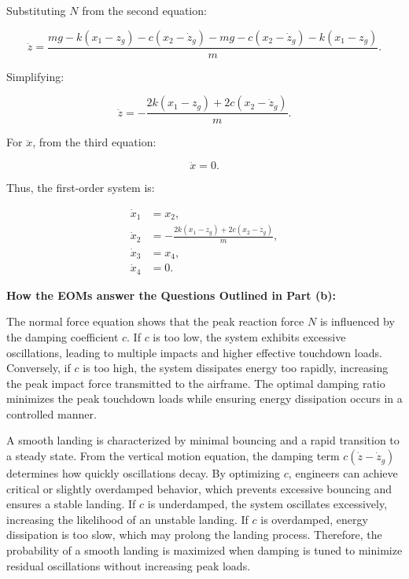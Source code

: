 \documentclass[12pt,letterpaper, onecolumn]{exam}
\begin{document}
\begin{questions}
\begin{solution}
\begin{parts}
Substituting \( N \) from the second equation:

\begin{equation}
    \ddot{z} = \frac{mg - k(x_1 - z_g) - c(x_2 - \dot{z}_g) - mg - c(x_2 - \dot{z}_g) - k(x_1 - z_g)}{m}.
\end{equation}

Simplifying:

\begin{equation}
    \ddot{z} = -\frac{2k(x_1 - z_g) + 2c(x_2 - \dot{z}_g)}{m}.
\end{equation}

For \( \ddot{x} \), from the third equation:

\begin{equation}
    \ddot{x} = 0.
\end{equation}



Thus, the first-order system is:

\begin{align}
    \dot{x}_1 &= x_2, \\
    \dot{x}_2 &= -\frac{2k(x_1 - z_g) + 2c(x_2 - \dot{z}_g)}{m}, \\
    \dot{x}_3 &= x_4, \\
    \dot{x}_4 &= 0.
\end{align}

\pagebreak
    \textbf{How the EOMs answer the Questions Outlined in Part (b):}  

    \vspace{5mm}
    The normal force equation shows that the peak reaction force \( N \) is influenced by the damping coefficient \( c \). If \( c \) is too low, the system exhibits excessive oscillations, leading to multiple impacts and higher effective touchdown loads. Conversely, if \( c \) is too high, the system dissipates energy too rapidly, increasing the peak impact force transmitted to the airframe. The optimal damping ratio minimizes the peak touchdown loads while ensuring energy dissipation occurs in a controlled manner.

    \vspace{5mm}
    
    A smooth landing is characterized by minimal bouncing and a rapid transition to a steady state. From the vertical motion equation, the damping term \( c(\dot{z} - \dot{z}_g) \) determines how quickly oscillations decay. By optimizing \( c \), engineers can achieve critical or slightly overdamped behavior, which prevents excessive bouncing and ensures a stable landing. If \( c \) is underdamped, the system oscillates excessively, increasing the likelihood of an unstable landing. If \( c \) is overdamped, energy dissipation is too slow, which may prolong the landing process. Therefore, the probability of a smooth landing is maximized when damping is tuned to minimize residual oscillations without increasing peak loads.


\end{parts}
\end{solution}
\end{questions}
\end{document}
